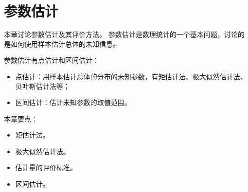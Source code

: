 \chapter{参数估计}

本章讨论参数估计及其评价方法。
参数估计是数理统计的一个基本问题，讨论的是如何使用样本估计总体的未知信息。

参数估计有点估计和区间估计：
\begin{itemize}
    \item 点估计：用样本估计总体的分布的未知参数，有矩估计法、极大似然估计法、贝叶斯估计法等；
    \item 区间估计：估计未知参数的取值范围。
\end{itemize}

本章要点：
\begin{itemize}
    \item 矩估计法。
    \item 极大似然估计法。
    \item 估计量的评价标准。
    \item 区间估计。
\end{itemize}

\newpage


\newpage


\newpage


\newpage





